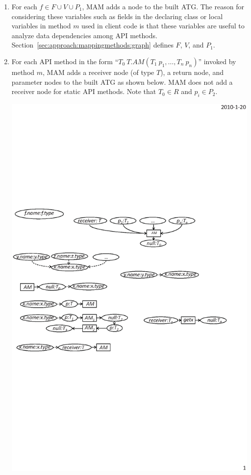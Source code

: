 \begin{enumerate}\vspace*{-2ex}
\item For each $f \in F \cup V \cup P_1$, MAM adds a node to the built ATG.
The reason for considering these variables such as fields in
the declaring class or local variables in method $m$ used in client code
is that these variables are useful to analyze data dependencies
among API methods. Section~\ref{sec:approach:mappingmethods:graph} defines $F$,  $V$, and $P_1$.\vspace*{-2ex}
\item For each API method in the form ``$T_0\ T.AM (T_1\ p_1, \ldots, T_n\ p_n)$''
invoked by method $m$, MAM adds a receiver node (of type $T$), a return node, and
parameter nodes to the built ATG as shown below. MAM does
not add a receiver node for static API methods. Note that $T_0 \in R$ and $p_i \in P_2$.
\vspace*{-2ex}

\begin{center}
\includegraphics[scale=0.7,clip]{figure/rule2.eps}%
\end{center}\vspace*{-3ex}


\end{enumerate}
